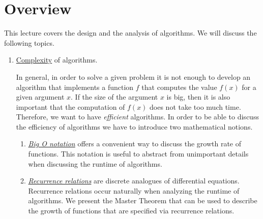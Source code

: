 \section{Overview}
This lecture covers the design and the analysis of algorithms.  We will discuss the following topics.
\begin{enumerate}

\item \href{http://en.wikipedia.org/wiki/Computational_complexity_theory}{Complexity} of algorithms.

      In general, in order to solve a given problem it is not enough to develop an algorithm that
      implements a function $f$ that computes the  value $f(x)$ for a given argument $x$.  If the size of
      the argument $x$ is big, then it is also important  
      that the computation of $f(x)$ does not take too much time.  Therefore, we want to have
      \emph{efficient} algorithms.
      In order to be able to discuss the efficiency of algorithms we have to introduce two 
      mathematical notions.
      \begin{enumerate}
      \item \href{http://en.wikipedia.org/wiki/Big_Oh}{\emph{Big O notation}} offers a convenient way to
            discuss the growth rate of functions.  This notation is useful to abstract from
            unimportant details when discussing the runtime of algorithms.  
      \item \href{http://en.wikipedia.org/wiki/Recurrence_relation}{\emph{Recurrence relations}}
            are discrete analogues of differential equations.  Recurrence relations occur naturally
            when analyzing the runtime of algorithms.  We present the Master Theorem that can be
            used to describe the growth of functions that are specified via recurrence relations.
      \end{enumerate}
\pagebreak


\end{enumerate}
